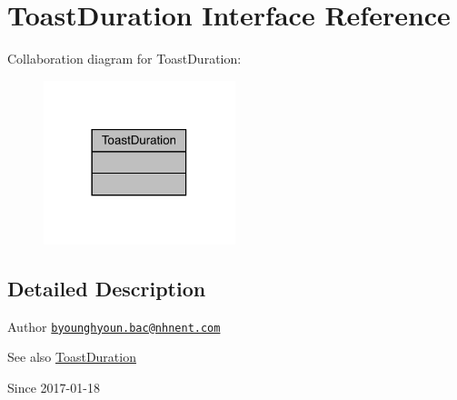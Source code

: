 \hypertarget{interfacecom_1_1toast_1_1android_1_1gamebase_1_1base_1_1annotation_1_1_toast_duration}{}\section{Toast\+Duration Interface Reference}
\label{interfacecom_1_1toast_1_1android_1_1gamebase_1_1base_1_1annotation_1_1_toast_duration}


Collaboration diagram for Toast\+Duration\+:\nopagebreak
\begin{figure}[H]
\begin{center}
\leavevmode
\includegraphics[width=158pt]{interfacecom_1_1toast_1_1android_1_1gamebase_1_1base_1_1annotation_1_1_toast_duration__coll__graph}
\end{center}
\end{figure}


\subsection{Detailed Description}
\begin{DoxyAuthor}{Author}
\href{mailto:byounghyoun.bac@nhnent.com}{\tt byounghyoun.\+bac@nhnent.\+com} 
\end{DoxyAuthor}
\begin{DoxySeeAlso}{See also}
\hyperlink{interfacecom_1_1toast_1_1android_1_1gamebase_1_1base_1_1annotation_1_1_toast_duration}{Toast\+Duration} 
\end{DoxySeeAlso}
\begin{DoxySince}{Since}
2017-\/01-\/18 
\end{DoxySince}
